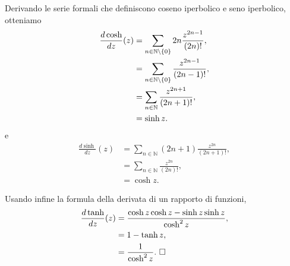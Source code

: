 \Proof Derivando le serie formali che definiscono coseno iperbolico e
seno iperbolico, otteniamo
\begin{align*}
  \frac{d\cosh}{dz}(z)
    &= \sum_{n \in \mathbb{N} \setminus \lbrace 0 \rbrace} 2n \frac{z^{2n - 1}}{(2n)!},\\
    &= \sum_{n \in \mathbb{N} \setminus \lbrace 0 \rbrace} \frac{z^{2n - 1}}{(2n - 1)!},\\
    &= \sum_{n \in \mathbb{N}} \frac{z^{2n + 1}}{(2n + 1)!},\\
    &= \sinh z.
\end{align*}
e
\begin{align*}
  \frac{d\sinh}{dz}(z)
    &= \sum_{n \in \mathbb{N}} (2n + 1)\frac{z^{2n}}{(2n + 1)!},\\
    &= \sum_{n \in \mathbb{N}} \frac{z^{2n}}{(2n)!},\\
    &= \cosh z.
\end{align*}
\par Usando infine la formula della derivata di un rapporto di funzioni,
\begin{align*}
  \frac{d\tanh}{dz}(z)
    &= \frac{\cosh z \cosh z - \sinh z \sinh z}{\cosh^2 z},\\
    &= 1 - \tanh z,\\
    &= \frac{1}{\cosh^2 z}.\text{ $\square$}
\end{align*}
